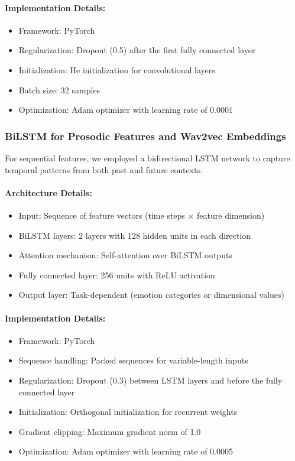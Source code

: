 \documentclass[12pt]{article}
\begin{document}
\paragraph{Implementation Details:}
\begin{itemize}
    \item Framework: PyTorch
    \item Regularization: Dropout (0.5) after the first fully connected layer
    \item Initialization: He initialization for convolutional layers
    \item Batch size: 32 samples
    \item Optimization: Adam optimizer with learning rate of 0.0001
\end{itemize}

\subsubsection{BiLSTM for Prosodic Features and Wav2vec Embeddings}
For sequential features, we employed a bidirectional LSTM network to capture temporal patterns from both past and future contexts.

\paragraph{Architecture Details:}
\begin{itemize}
    \item Input: Sequence of feature vectors (time steps × feature dimension)
    \item BiLSTM layers: 2 layers with 128 hidden units in each direction
    \item Attention mechanism: Self-attention over BiLSTM outputs
    \item Fully connected layer: 256 units with ReLU activation
    \item Output layer: Task-dependent (emotion categories or dimensional values)
\end{itemize}

\paragraph{Implementation Details:}
\begin{itemize}
    \item Framework: PyTorch
    \item Sequence handling: Packed sequences for variable-length inputs
    \item Regularization: Dropout (0.3) between LSTM layers and before the fully connected layer
    \item Initialization: Orthogonal initialization for recurrent weights
    \item Gradient clipping: Maximum gradient norm of 1.0
    \item Optimization: Adam optimizer with learning rate of 0.0005
\end{itemize}
\end{document}
